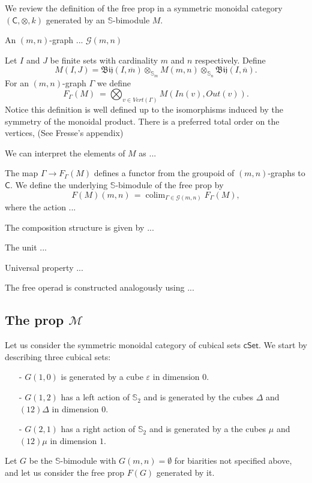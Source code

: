 \documentclass{amsart}
\renewcommand{\S}{\mathbb{S}}
\newcommand{\Bij}{\mathfrak{Bij}}
\DeclareMathOperator*{\colim}{colim}
\newcommand{\cSet}{\mathsf{cSet}}
\begin{document}
We review the definition of the free prop in a symmetric monoidal category $(\mathsf C, \otimes, k)$ generated by an $\S$-bimodule $M$.

An $(m, n)$-graph ... $\mathcal G(m, n)$

Let $I$ and $J$ be finite sets with cardinality $m$ and $n$ respectively.
Define
\begin{equation*}
M(I, J) = \Bij(I, \overline m) \otimes_{\S_m} M(m, n) \otimes_{\S_n} \Bij(I, \overline n).
\end{equation*}
For an $(m, n)$-graph $\Gamma$ we define
\begin{equation*}
F_\Gamma(M)\ =\!\!\! \bigotimes_{v \in Vert(\Gamma)}M(In(v), Out(v)).
\end{equation*}
Notice this definition is well defined up to the isomorphisms induced by the symmetry of the monoidal product. There is a preferred total order on the vertices, (See Fresse's appendix)

We can interpret the elements of $M$ as ...

The map $\Gamma \to F_\Gamma(M)$ defines a functor from the groupoid of $(m,n)$-graphs to $\mathsf C$. We define the underlying $\S$-bimodule of the free prop by
\begin{equation*}
F(M)(m, n)\, =\! \colim_{\Gamma \in \mathcal G(m, n)} F_\Gamma(M),
\end{equation*}
where the action ...

The composition structure is given by ...

The unit ...

Universal property ...

The free operad is constructed analogously using ...

\subsection{The prop $\mathcal M$}

Let us consider the symmetric monoidal category of cubical sets $\cSet$. We start by describing three cubical sets:
\begin{itemize}
	\item[-]$G(1, 0)$ is generated by a cube $\varepsilon$ in dimension $0$.
	\item[-]$G(1, 2)$ has a left action of $\S_2$ and is generated by the cubes $\Delta$ and $(12)\Delta$ in dimension $0$.
	\item[-]$G(2, 1)$ has a right action of $\S_2$ and is generated by a the cubes $\mu$ and $(12)\mu$ in dimension $1$.
\end{itemize}
Let $G$ be the $\S$-bimodule with $G(m, n) = \emptyset$ for biarities not specified above, and let us consider the free prop $F(G)$ generated by it.
\end{document}
